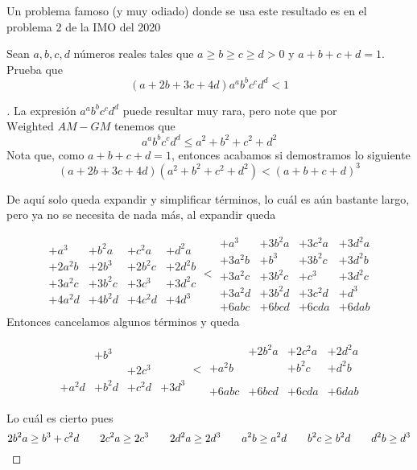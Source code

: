 \documentclass[11pt]{scrartcl}
\begin{document}
Un problema famoso (y muy odiado) donde se usa este resultado es en el problema 2 de la IMO del 2020
\begin{example}
    Sean $a,b,c,d$ números reales tales que $a\geq b\geq c\geq d>0$ y $a+b+c+d=1$. Prueba que \[(a+2b+3c+4d)a^ab^bc^cd^d<1\]
\end{example}
\begin{proof}[\href{https://artofproblemsolving.com/community/c6h2278647p17822092}{}]
    La expresión $a^ab^bc^cd^d$ puede resultar muy rara, pero note que por $\hyperref[Weighted AM-GM]{\text{Weighted $AM-GM$}}$ tenemos que \[a^ab^bc^cd^d\leq a^2+b^2+c^2+d^2\]
    Nota que, como $a+b+c+d=1$, entonces acabamos si demostramos lo siguiente
    \[(a + 2b + 3c + 4d)(a^2 + b^2 + c^2 + d^2) <(a + b + c + d)^3\]

    De aquí solo queda expandir y simplificar términos, lo cuál es aún bastante largo, pero ya no se necesita de nada más, al expandir queda 

    \[ \begin{array}{cccc} +a^3 &+ b^2a &+ c^2a & +d^2a \\ +2a^2b &+ 2b^3 &+ 2b^2c & +2d^2b \\ +3a^2c & + 3b^2c & + 3c^3 & + 3d^2c \\ +4a^2d &+ 4b^2d & + 4c^2d & + 4d^3 \end{array} < \begin{array}{cccc} +a^3 &+ 3b^2a &+ 3c^2a & +3d^2a \\ +3a^2b &+ b^3 &+ 3b^2c & +3d^2b \\ +3a^2c &+ 3b^2c &+ c^3 &+ 3d^2c \\ +3a^2d &+ 3b^2d &+ 3c^2d &+ d^3 \\ +6abc &+ 6bcd &+ 6cda &+ 6dab \end{array} \]
    Entonces cancelamos algunos términos y queda 

    \[ \begin{array}{cccc} & && \\ &+ b^3 & & \\ & & +2c^3 & \\ +a^2d &+ b^2d & + c^2d & + 3d^3 \\ \end{array} < \begin{array}{cccc} &+ 2b^2a &+ 2c^2a & +2d^2a \\ +a^2b & &+ b^2c & +d^2b \\ &&& \\ &&& \\ +6abc &+ 6bcd &+ 6cda &+ 6dab \end{array} \]

    Lo cuál es cierto pues
    \[2b^2a \ge b^3 + c^2d \hspace{0.69cm} 2c^2a \ge 2c^3 \hspace{0.69cm} 2d^2a \ge 2d^3\hspace{0.69cm} a^2b \ge a^2d \hspace{0.69cm} b^2c \ge b^2d \hspace{0.69cm} d^2b \ge d^3\]
\end{proof}
\end{document}
